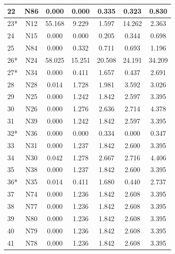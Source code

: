 \documentclass[10p]{article}
\theoremstyle{definition}
\theoremstyle{definition}
\begin{document}
\begin{appendices}
\begin{table}[!ht]
\begin{tabular}{lcccccc}
 \hline
 22 & N86 & 0.000 & 0.000 &0.335 & 0.323& 0.830\\
 \hline
 23* & N12 & 55.168 & 9.229 & 1.597& 14.262& 2.363 \\
 \hline
 24 & N15 & 0.000 & 0.000& 0.205& 0.344 & 0.698\\
 \hline
 25 & N84 & 0.000 & 0.332 & 0.711& 0.693&1.196 \\
 \hline
 26* & N24 & 58.025 &15.251 &20.508 & 24.191 & 34.209\\
 \hline
 27* & N34 & 0.000 & 0.411&1.657 & 0.437&2.691 \\
 \hline
 28 & N28 & 0.014 &1.728 & 1.981& 3.592 & 3.026\\
 \hline
 29 & N25 & 0.000 & 1.242& 1.842& 2.597&  3.395\\
 \hline
 30 & N26 & 0.000 & 1.276 &2.636 &2.714& 4.378 \\
 \hline
 31 & N39 & 0.000 & 1.242&1.842 & 2.597&  3.395\\
 \hline
 32* & N36 & 0.000 &0.000 &0.334 &0.000 & 0.347\\
 \hline
 33 & N31 & 0.000 &1.237 & 1.842& 2.600 &3.395 \\
 \hline
 34 & N30 & 0.042 & 1.278 & 2.667&2.716 & 4.406\\
 \hline
 35 & N38 & 0.000  &1.237 & 1.842&2.600& 3.395 \\
 \hline
 36* & N35 &0.014 &0.411 &1.680 & 0.440 &2.737 \\
 \hline
 37 & N74 & 0.000 &1.236 & 1.842& 2.608 & 3.395\\
 \hline
 38 & N77 & 0.000  &1.236 & 1.842&  2.608&3.395 \\
 \hline
 39 & N80 & 0.000 &1.236  & 1.842& 2.608& 3.395 \\
 \hline
 40 & N79 & 0.000 &1.236 & 1.842&  2.608&3.395 \\
 \hline
  41 & N78 & 0.000 &1.236  & 1.842&  2.608&3.395 \\
 \hline
\bottomrule
\end{tabular}
\end{table}
\clearpage

\end{appendices}
\end{document}
